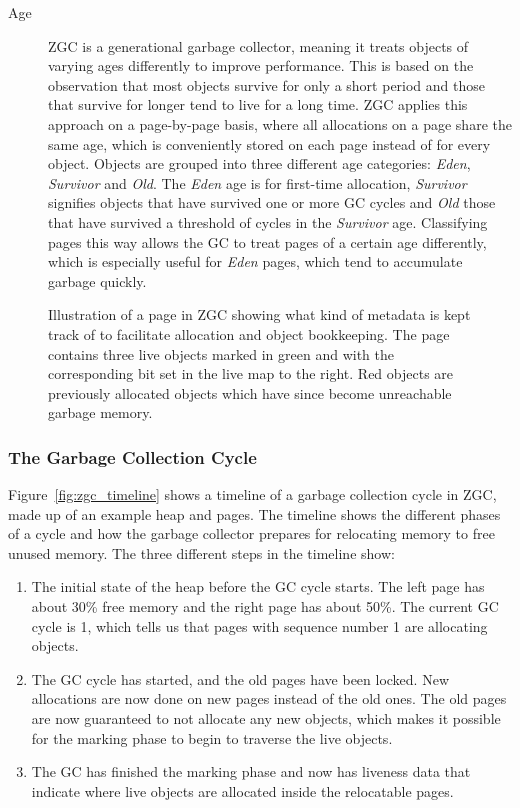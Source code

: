 \begin{description}
    \item[Age]
        ZGC is a generational garbage collector, meaning it treats objects of varying ages differently to improve performance. This is based on the observation that most objects survive for only a short period and those that survive for longer tend to live for a long time. ZGC applies this approach on a page-by-page basis, where all allocations on a page share the same age, which is conveniently stored on each page instead of for every object. Objects are grouped into three different age categories: \textit{Eden}, \textit{Survivor} and \textit{Old}. The \textit{Eden} age is for first-time allocation, \textit{Survivor} signifies objects that have survived one or more GC cycles and \textit{Old} those that have survived a threshold of cycles in the \textit{Survivor} age. Classifying pages this way allows the GC to treat pages of a certain age differently, which is especially useful for \textit{Eden} pages, which tend to accumulate garbage quickly.
\end{description}

\begin{figure}[H]
    \centering
    
    \caption{Illustration of a page in ZGC showing what kind of metadata is kept track of to facilitate allocation and object bookkeeping. The page contains three live objects marked in green and with the corresponding bit set in the live map to the right. Red objects are previously allocated objects which have since become unreachable garbage memory.} 
    \label{fig:zpages}
\end{figure}

\subsubsection{The Garbage Collection Cycle}

Figure~\ref{fig:zgc_timeline} shows a timeline of a garbage collection cycle in ZGC, made up of an example heap and pages. The timeline shows the different phases of a cycle and how the garbage collector prepares for relocating memory to free unused memory. The three different steps in the timeline show:

\vspace*{-0.4cm}

\begin{enumerate}[label=\alph*)]
    \item The initial state of the heap before the GC cycle starts. The left page has about 30\% free memory and the right page has about 50\%. The current GC cycle is 1, which tells us that pages with sequence number 1 are allocating objects.
    \item The GC cycle has started, and the old pages have been locked. New allocations are now done on new pages instead of the old ones. The old pages are now guaranteed to not allocate any new objects, which makes it possible for the marking phase to begin to traverse the live objects.
    \item The GC has finished the marking phase and now has liveness data that indicate where live objects are allocated inside the relocatable pages.
\end{enumerate}

